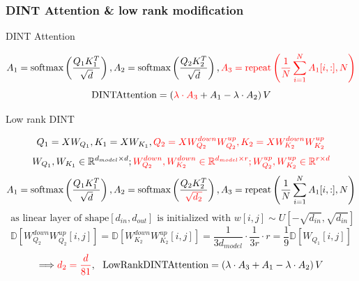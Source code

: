 \documentclass[10pt]{beamer}
\begin{document}
\begin{frame}
    \frametitle{DINT Attention \& low rank modification}

    \begin{block}{DINT Attention}
        \vspace{-0.5cm}
        
        $$A_1 = \text{softmax}\left(\frac{Q_1 K_1^T}{\sqrt{d}}\right), A_2 = \text{softmax}\left(\frac{Q_2 K_2^T}{\sqrt{d}}\right), \textcolor{red}{A_3 = \text{repeat}\left(\frac{1}{N}\sum\limits_{i=1}^{N}A_1[i,:], N\right)}$$
        $$\text{DINTAttention} = \left(\textcolor{red}{\lambda\cdot A_3} + A_1 - \lambda\cdot A_2 \right) V$$

    \end{block}

    \begin{block}{Low rank DINT}
        \vspace{-0.5cm}

        $$Q_1 = X W_{Q_1}, K_1 = X W_{K_1}, \textcolor{red}{Q_2 = XW_{Q_2}^{down} W_{Q_2}^{up}, K_2 = XW_{K_2}^{down} W_{K_2}^{up}}$$
        $$W_{Q_1}, W_{K_1} \in \mathbb{R}^{d_{model} \times d}; \textcolor{red}{W_{Q_2}^{down}, W_{K_2}^{down} \in \mathbb{R}^{d_{model} \times r}; W_{Q_2}^{up}, W_{K_2}^{up} \in \mathbb{R}^{r \times d}} $$
        $$A_1 = \text{softmax}\left(\frac{Q_1 K_1^T}{\sqrt{d}}\right), A_2 = \text{softmax}\left(\frac{Q_2 K_2^T}{\textcolor{red}{\sqrt{d_2}}}\right), A_3 = \text{repeat}\left(\frac{1}{N}\sum\limits_{i=1}^{N}A_1[i,:], N\right)$$
        $$\text{ as linear layer of shape} [d_{in}, d_{out}] \text{ is initialized with } w[i,j] \sim U[-\sqrt{d_{in}}, \sqrt{d_{in}}]$$ $$\mathbb{D}[W_{Q_2}^{down} W_{Q_2}^{up}[i,j]] = \mathbb{D}[W_{K_2}^{down} W_{K_2}^{up}[i,j]] = \frac{1}{3 d_{model}}\cdot \frac{1}{3 r}\cdot r = \frac{1}{9}\mathbb{D}[W_{Q_1}[i,j]]$$
        $$\Longrightarrow \textcolor{red}{d_2 = \frac{d}{81}},~~ \text{LowRankDINTAttention} = \left(\lambda\cdot A_3 + A_1 - \lambda\cdot A_2 \right) V$$

    \end{block}
        
\end{frame}
\end{document}
